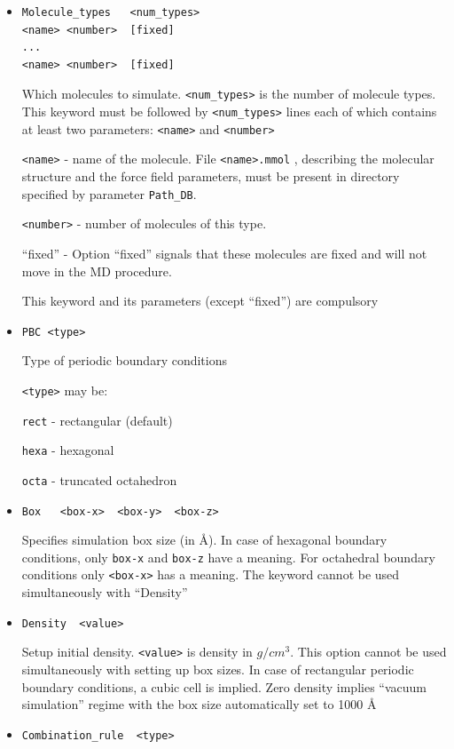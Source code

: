 \documentclass{article}
\begin{document}
\begin{itemize}

\item
\begin{verbatim}
Molecule_types   <num_types>
<name> <number>  [fixed]
...
<name> <number>  [fixed]
\end{verbatim}

Which molecules to simulate. \verb|<num_types>| is the number of molecule
types. This keyword must be followed by \verb|<num_types>| lines each of 
which contains at least two parameters: \verb|<name>| and \verb|<number>|

\verb|<name>| - name of the molecule. File \verb|<name>.mmol| , describing
the molecular structure and the force field parameters, must be 
present in directory specified by parameter \verb|Path_DB|.

\verb|<number>| - number of molecules of this type.

``fixed'' - Option ``fixed''  signals that 
these molecules are fixed and will not move in the MD procedure.

This keyword and its parameters (except ``fixed'') are compulsory

\item
\verb|PBC <type>|

Type of periodic boundary conditions

\verb|<type>| may be:

\verb|rect|   - rectangular (default)

\verb|hexa|   - hexagonal

\verb|octa|   - truncated octahedron

\item
\verb|Box   <box-x>  <box-y>  <box-z>|

Specifies simulation box size (in \AA). In case of hexagonal boundary 
conditions, only \verb|box-x| and \verb|box-z| have a meaning. 
For octahedral boundary conditions only \verb|<box-x>| has a meaning. 
The keyword cannot be used simultaneously with ``Density''

\item
\verb|Density  <value>|

Setup initial density. \verb|<value>| is density in $g/cm^3$. This option 
cannot be used simultaneously with setting up box sizes. In case of 
rectangular periodic boundary conditions, a cubic cell is implied. Zero 
density implies ``vacuum simulation'' regime with the box size automatically 
set to 1000 \AA 

\item
\verb|Combination_rule  <type>|


\end{itemize}
\end{document}
